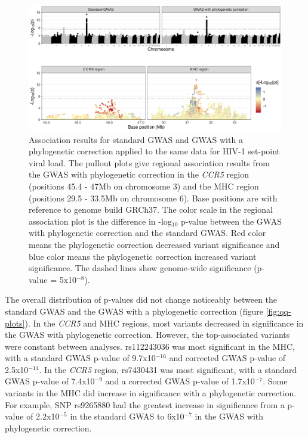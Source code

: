 \documentclass[]{article}
\begin{document}
\begin{doublespace}
\begin{figure}[H]
	\begin{center}
		\includegraphics[width=\linewidth]{figures_archived/200207_gwas_results}
		\caption{Association results for standard GWAS and GWAS with a phylogenetic correction applied to the same data for HIV-1 set-point viral load. The pullout plots give regional association results from the GWAS with phylogenetic correction in the \emph{CCR5} region (positions 45.4 - 47Mb on chromosome 3) and the MHC region (positions 29.5 - 33.5Mb on chromosome 6). Base positions are with reference to genome build GRCh37. The color scale in the regional association plot is the difference in -log$_{10}$ p-value between the GWAS with phylogenetic correction and the standard GWAS. Red color means the phylogenetic correction decreased variant significance and blue color means the phylogenetic correction increased variant significance. The dashed lines show genome-wide significance (p-value = 5x10$^{-8}$).}
		\label{fig:gwas-results}
	\end{center}
\end{figure}

The overall distribution of p-values did not change noticeably between the standard GWAS and the GWAS with a phylogenetic correction (figure \ref{fig:qq-plots}). In the \emph{CCR5} and MHC regions, most variants decreased in significance in the GWAS with phylogenetic correction. However, the top-associated variants were constant between analyses. rs112243036 was most significant in the MHC, with a standard GWAS p-value of 9.7x10$^{-16}$ and corrected GWAS p-value of 2.5x10$^{-14}$. In the \emph{CCR5} region, rs7430431 was most significant, with a standard GWAS p-value of 7.4x10$^{-9}$ and a corrected GWAS p-value of 1.7x10$^{-7}$. Some variants in the MHC did increase in significance with a phylogenetic correction. For example, SNP rs9265880 had the greatest increase in significance from a p-value of 2.2x10$^{-5}$ in the standard GWAS to 6x10$^{-7}$ in the GWAS with phylogenetic correction. 


\end{doublespace}
\end{document}
